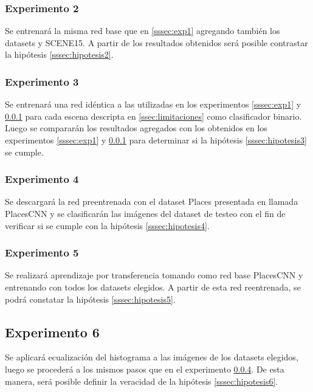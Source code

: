 \subsubsection{Experimento 2} \label{sssec:exp2}
Se entrenará la misma red base que en \ref{sssec:exp1} agregando también los datasets \cite{lstm_real_estate} y SCENE15. A partir de los resultados obtenidos será posible contrastar la hipótesis \ref{sssec:hipotesis2}.

\subsubsection{Experimento 3} \label{sssec:exp3}
Se entrenará una red idéntica a las utilizadas en los experimentos \ref{sssec:exp1} y \ref{sssec:exp2} para cada escena descripta en \ref{ssec:limitaciones} como clasificador binario. Luego se compararán los resultados agregados con los obtenidos en los experimentos \ref{sssec:exp1} y \ref{sssec:exp2} para determinar si la hipótesis \ref{sssec:hipotesis3} se cumple.

\subsubsection{Experimento 4} \label{sssec:exp4}
Se descargará la red preentrenada con el dataset Places presentada en \cite{learning_deep_features} llamada PlacesCNN y se clasificarán las imágenes del dataset de testeo con el fin de verificar si se cumple con la hipótesis \ref{sssec:hipotesis4}.

\subsubsection{Experimento 5} \label{sssec:exp5}
Se realizará aprendizaje por transferencia tomando como red base PlacesCNN y entrenando con todos los datasets elegidos. A partir de esta red reentrenada, se podrá constatar la hipótesis \ref{sssec:hipotesis5}.

\subsection{Experimento 6} \label{sssec:exp6}
Se aplicará ecualización del histograma a las imágenes de los datasets elegidos, luego se procederá a los mismos pasos que en el experimento \ref{sssec:exp5}. De esta manera, será posible definir la veracidad de la hipótesis \ref{sssec:hipotesis6}.